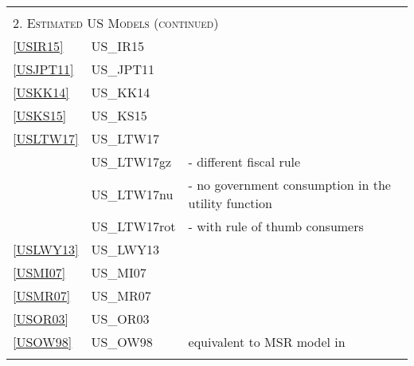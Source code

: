 \documentclass[11pt,a4paper]{article}
\begin{document}
	
	
	\vspace{-1cm}
	
	\begin{table}[H]
		\begin{tabularx}{\textwidth}{lll}
			\hline \hline
			&& \\
			\multicolumn{3}{l}{\textsc{2. Estimated US Models (continued)}} \\
			\ref{USIR15} & US\_IR15 & \cite{ireland2015monetary}\\
			\ref{USJPT11} & US\_JPT11 & \cite{Justinianoetal2011}\\ 	
			\ref{USKK14} & US\_KK14 & \cite{kliem2014kriwoluzky} \\
			\ref{USKS15} & US\_KS15 & \cite{kriwoluzky2015stoltenberg} \\		
			\ref{USLTW17} & US\_LTW17 & \cite{leeper2017traum} \\
			& US\_LTW17gz &	\cite{leeper2017traum} - different fiscal rule\\
			& US\_LTW17nu & \cite{leeper2017traum} - no government consumption in the utility function\\
			& US\_LTW17rot & \cite{leeper2017traum} - with rule of thumb consumers \\
			\ref{USLWY13} & US\_LWY13 & \cite{leeper2013fiscal}\\
			\ref{USMI07} & US\_MI07 & \cite{Milani2007} \\
			\ref{USMR07} & US\_MR07 & \cite{MankiwReis2007} \\
			\ref{USOR03} & US\_OR03 & \cite{Orphanides2003} \\
			\ref{USOW98} & US\_OW98 & \cite{OrphanidesWieland1998} equivalent to MSR model in \\
			& & \cite{LevinWielandWilliams2003} \\
			

\end{tabularx}
\end{table}
\end{document}
